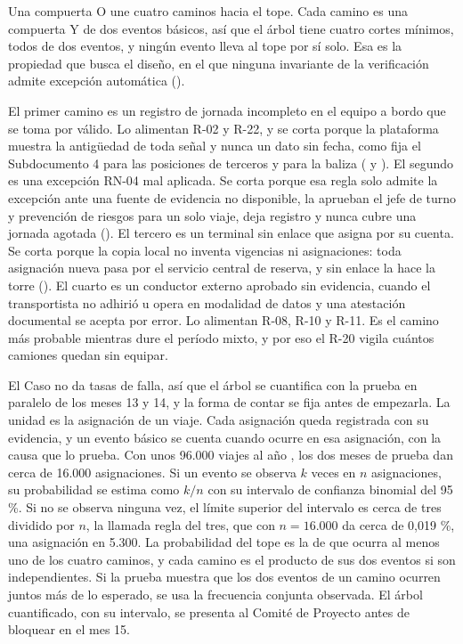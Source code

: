 Una compuerta O une cuatro caminos hacia el tope. Cada camino es una compuerta Y de dos eventos básicos,
así que el árbol tiene cuatro cortes mínimos, todos de dos eventos, y ningún evento lleva al tope por sí
solo. Esa es la propiedad que busca el diseño, en el que ninguna invariante de la verificación admite
excepción automática ().

El primer camino es un registro de jornada incompleto en el equipo a bordo que se toma por válido. Lo
alimentan R-02 y R-22, y se corta porque la plataforma muestra la antigüedad de toda señal y nunca un
dato sin fecha, como fija el Subdocumento 4 para las posiciones de terceros y para la baliza
( y ).
El segundo es una excepción RN-04 mal aplicada. Se corta porque esa regla solo admite la excepción ante
una fuente de evidencia no disponible, la aprueban el jefe de turno y prevención de riesgos para un solo
viaje, deja registro y nunca cubre una jornada agotada (). El tercero es
un terminal sin enlace que asigna por su cuenta. Se corta porque la copia local no inventa vigencias ni
asignaciones: toda asignación nueva pasa por el servicio central de reserva, y sin enlace la hace la
torre (). El cuarto
es un conductor externo aprobado sin evidencia, cuando el transportista no adhirió u opera en modalidad
de datos y una atestación documental se acepta por error. Lo alimentan R-08, R-10 y R-11. Es el camino
más probable mientras dure el período mixto, y por eso el R-20 vigila cuántos camiones quedan sin
equipar.

El Caso no da tasas de falla, así que el árbol se cuantifica con la prueba en paralelo de los meses 13
y 14, y la forma de contar se fija antes de empezarla. La unidad es la asignación de un viaje. Cada
asignación queda registrada con su evidencia, y un evento básico se cuenta cuando ocurre en esa
asignación, con la causa que lo prueba. Con unos 96.000 viajes al año , los dos
meses de prueba dan cerca de 16.000 asignaciones. Si un evento se observa $k$ veces en $n$ asignaciones,
su probabilidad se estima como $k/n$ con su intervalo de confianza binomial del 95 \%. Si no se observa
ninguna vez, el límite superior del intervalo es cerca de tres dividido por $n$, la llamada regla del tres, que con
$n = 16.000$ da cerca de 0,019 \%, una asignación en 5.300. La probabilidad del tope es la de que ocurra al menos uno de los cuatro caminos, y
cada camino es el producto de sus dos eventos si son independientes. Si la prueba muestra que los dos
eventos de un camino ocurren juntos más de lo esperado, se usa la frecuencia conjunta observada. El
árbol cuantificado, con su intervalo, se presenta al Comité de Proyecto antes de bloquear en el mes 15.

